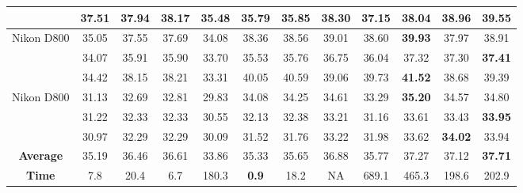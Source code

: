 \documentclass[10pt,twocolumn,letterpaper]{article}
\begin{document}
\begin{table}
\begin{center}
\begin{tabular}{|c||c|c|c|c|c|c|c|c|c|c|c|}
\\ 
\cline{2-12}    
& 37.51 & 37.94 & 38.17 & 35.48 & 35.79 & 35.85 & 38.30 & 37.15 & 38.04 & 38.96 & \textbf{39.55}
\\
\hline
\multirow{3}{*}{Nikon D800} 
& 35.05 & 37.55 & 37.69 & 34.08 & 38.36 & 38.56 & 39.01 & 38.60 & \textbf{39.93} & 37.97 & 38.91
\\ 
\cline{2-12} 
\multirow{3}{*}{ISO = 3200}   
& 34.07 & 35.91 & 35.90 & 33.70 & 35.53 & 35.76 & 36.75 & 36.04 & 37.32 & 37.30 & \textbf{37.41}
\\ 
\cline{2-12}    
& 34.42 & 38.15 & 38.21 & 33.31 & 40.05 & 40.59 & 39.06 & 39.73 & \textbf{41.52} & 38.68 & 39.39
\\ 
\hline
\multirow{3}{*}{Nikon D800} 
& 31.13 & 32.69 & 32.81 & 29.83 & 34.08 & 34.25 & 34.61 & 33.29 & \textbf{35.20} & 34.57 & 34.80
\\ 
\cline{2-12} 
\multirow{3}{*}{ISO = 6400}   
& 31.22 & 32.33 & 32.33 & 30.55 & 32.13 & 32.38  & 33.21 & 31.16 & 33.61 & 33.43 & \textbf{33.95}
\\ 
\cline{2-12}    
& 30.97 & 32.29 & 32.29 & 30.09 & 31.52 & 31.76 & 33.22 & 31.98 & 33.62 & \textbf{34.02} & 33.94
\\
\hline
\textbf{Average} 
& 35.19 & 36.46 & 36.61 & 33.86 & 35.33 & 35.65 & 36.88 & 35.77 & 37.27 & 37.12 & \textbf{ 37.71}
\\
\hline
\textbf{Time} 
& 7.8 & 20.4 & 6.7 & 180.3 & \textbf{0.9} & 18.2 & NA & 689.1 & 465.3 & 198.6 & 202.9
\\
\hline
\end{tabular}
\end{center}
\vspace{-0mm}
\end{table}
\end{document}
